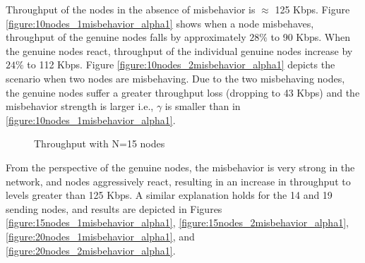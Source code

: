 \documentclass[12pt,letterpaper,english]{article}
\begin{document}
Throughput of the nodes in the absence of misbehavior is $\approx$ 125 Kbps. Figure  \ref{figure:10nodes_1misbehavior_alpha1} shows when a node misbehaves, throughput of the genuine nodes falls by approximately $28\%$ to 90 Kbps. When the genuine nodes react, throughput of the individual genuine nodes increase by $24\%$ to 112 Kbps.
Figure \ref{figure:10nodes_2misbehavior_alpha1} depicts the scenario when two nodes are misbehaving. Due to the two misbehaving nodes, the genuine nodes suffer a greater throughput loss (dropping to 43 Kbps) and the misbehavior strength is larger i.e., $\gamma$ is smaller than in \ref{figure:10nodes_1misbehavior_alpha1}.
\begin{figure}
\centering
{}
\caption{Throughput with N=15 nodes}
\label{figure:15nodes}
\end{figure}
From the perspective of the genuine nodes, the misbehavior is very strong in the network, and nodes aggressively react, resulting in an increase in throughput to levels greater than 125 Kbps.
A similar explanation holds for the 14 and 19 sending nodes, and results are depicted in Figures \ref{figure:15nodes_1misbehavior_alpha1}, \ref{figure:15nodes_2misbehavior_alpha1}, \ref{figure:20nodes_1misbehavior_alpha1}, and \ref{figure:20nodes_2misbehavior_alpha1}.
\end{document}
